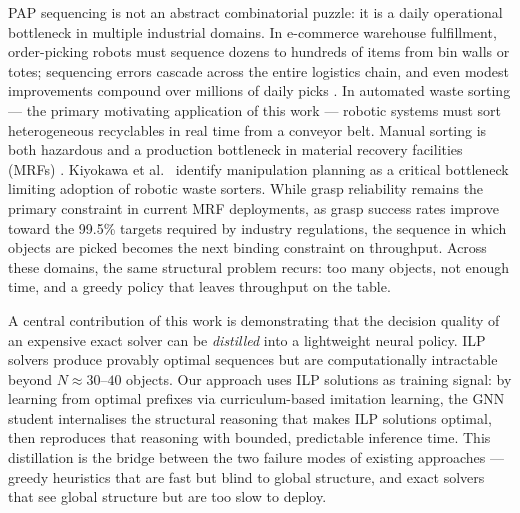 \documentclass[conference]{IEEEtran}
\begin{document}
PAP sequencing is not an abstract combinatorial puzzle: it is a daily operational bottleneck in multiple industrial domains. In e-commerce warehouse fulfillment, order-picking robots must sequence dozens to hundreds of items from bin walls or totes; sequencing errors cascade across the entire logistics chain, and even modest improvements compound over millions of daily picks \cite{cheng2024drl}. In automated waste sorting --- the primary motivating application of this work --- robotic systems must sort heterogeneous recyclables in real time from a conveyor belt. Manual sorting is both hazardous and a production bottleneck in material recovery facilities (MRFs) \cite{gundupalli2020sequence}. Kiyokawa et al.\ \cite{kiyokawa2024challenges} identify manipulation planning as a critical bottleneck limiting adoption of robotic waste sorters. While grasp reliability remains the primary constraint in current MRF deployments, as grasp success rates improve toward the 99.5\% targets required by industry regulations, the sequence in which objects are picked becomes the next binding constraint on throughput. Across these domains, the same structural problem recurs: too many objects, not enough time, and a greedy policy that leaves throughput on the table.

A central contribution of this work is demonstrating that the decision quality of an expensive exact solver can be \emph{distilled} into a lightweight neural policy. ILP solvers produce provably optimal sequences but are computationally intractable beyond $N \approx 30$--$40$ objects. Our approach uses ILP solutions as training signal: by learning from optimal prefixes via curriculum-based imitation learning, the GNN student internalises the structural reasoning that makes ILP solutions optimal, then reproduces that reasoning with bounded, predictable inference time. This distillation is the bridge between the two failure modes of existing approaches --- greedy heuristics that are fast but blind to global structure, and exact solvers that see global structure but are too slow to deploy.
\end{document}
